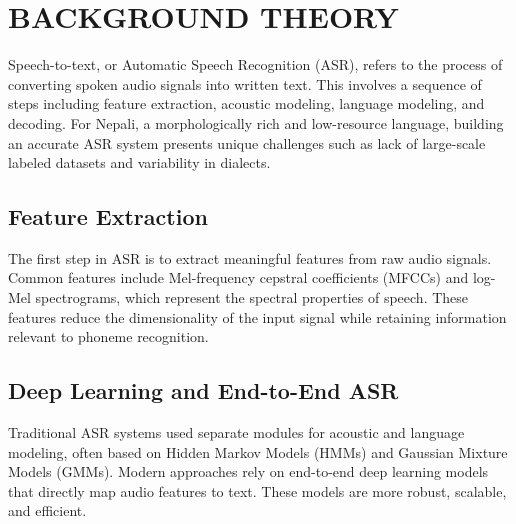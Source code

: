 \chapter{BACKGROUND THEORY}

Speech-to-text, or Automatic Speech Recognition (ASR), refers to the process of converting spoken audio signals into written text. This involves a sequence of steps including feature extraction, acoustic modeling, language modeling, and decoding. For Nepali, a morphologically rich and low-resource language, building an accurate ASR system presents unique challenges such as lack of large-scale labeled datasets and variability in dialects.

\section{Feature Extraction}
The first step in ASR is to extract meaningful features from raw audio signals. Common features include Mel-frequency cepstral coefficients (MFCCs) and log-Mel spectrograms, which represent the spectral properties of speech. These features reduce the dimensionality of the input signal while retaining information relevant to phoneme recognition.

\section{Deep Learning and End-to-End ASR}
Traditional ASR systems used separate modules for acoustic and language modeling, often based on Hidden Markov Models (HMMs) and Gaussian Mixture Models (GMMs). Modern approaches rely on end-to-end deep learning models that directly map audio features to text. These models are more robust, scalable, and efficient.


